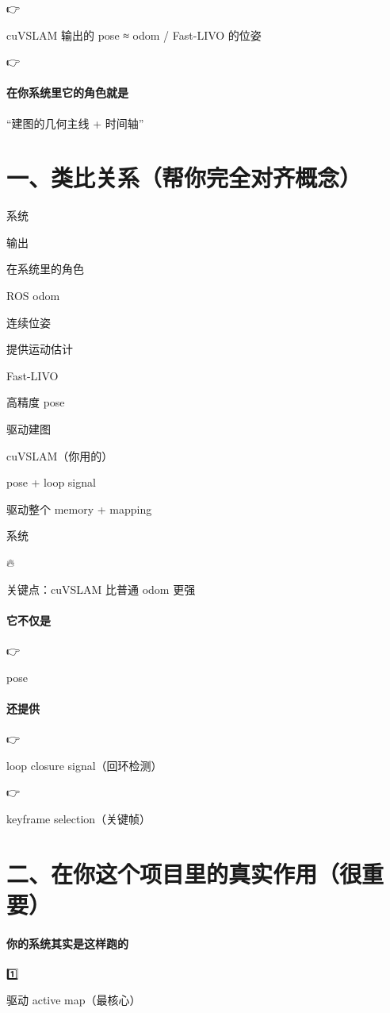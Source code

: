 \documentclass[12pt]{article}
\begin{document}
👉

cuVSLAM 输出的 pose ≈ odom / Fast-LIVO 的位姿

👉

\paragraph{在你系统里它的角色就是}
“建图的几何主线 + 时间轴”

\section{一、类比关系（帮你完全对齐概念）}
系统

输出

在系统里的角色

ROS odom

连续位姿

提供运动估计

Fast-LIVO

高精度 pose

驱动建图

cuVSLAM（你用的）

pose + loop signal

驱动整个 memory + mapping

系统

🔥

关键点：cuVSLAM 比普通 odom 更强

\paragraph{它不仅是}
👉

pose

\paragraph{还提供}
👉

loop closure signal（回环检测）

👉

keyframe selection（关键帧）

\section{二、在你这个项目里的真实作用（很重要）}
\paragraph{你的系统其实是这样跑的}
1️⃣

驱动 active map（最核心）
\end{document}
